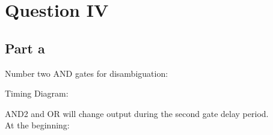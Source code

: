 \documentclass[12pt, a4paper]{article}
\begin{document}
	\section*{Question IV}
	\subsection*{Part a}
	Number two AND gates for disambiguation:
	\begin{center}
	\end{center}
	
	Timing Diagram:
	\begin{center}
	\end{center}
	
	AND2 and OR will change output during the second gate delay period.
	\\
	
	At the beginning:
	
\end{document}
